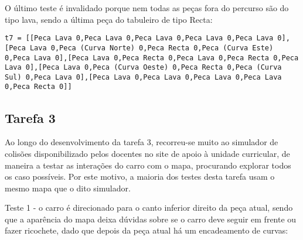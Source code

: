 \documentclass[a4paper]{report}
\begin{document}
O último teste é invalidado porque nem todas as peças fora do percurso são do tipo lava, sendo a última peça do tabuleiro de tipo Recta:

\begin{lstlisting}
t7 = [[Peca Lava 0,Peca Lava 0,Peca Lava 0,Peca Lava 0,Peca Lava 0],[Peca Lava 0,Peca (Curva Norte) 0,Peca Recta 0,Peca (Curva Este) 0,Peca Lava 0],[Peca Lava 0,Peca Recta 0,Peca Lava 0,Peca Recta 0,Peca Lava 0],[Peca Lava 0,Peca (Curva Oeste) 0,Peca Recta 0,Peca (Curva Sul) 0,Peca Lava 0],[Peca Lava 0,Peca Lava 0,Peca Lava 0,Peca Lava 0,Peca Recta 0]]
\end{lstlisting}

\subsection{Tarefa 3}

Ao longo do desenvolvimento da tarefa 3, recorreu-se muito ao simulador de colisões disponibilizado pelos docentes no site de apoio à unidade curricular, de maneira a testar as interações do carro com o mapa, procurando explorar todos os caso possíveis. Por este motivo, a maioria dos testes desta tarefa usam o mesmo mapa que o dito simulador.

Teste 1 - o carro é direcionado para o canto inferior direito da peça atual, sendo que a aparência do mapa deixa dúvidas sobre se o carro deve seguir em frente ou fazer ricochete, dado que depois da peça atual há um encadeamento de curvas:
\end{document}

